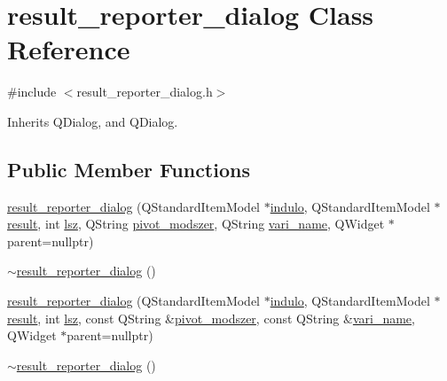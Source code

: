 \hypertarget{classresult__reporter__dialog}{}\section{result\+\_\+reporter\+\_\+dialog Class Reference}
\label{classresult__reporter__dialog}


{\ttfamily \#include $<$result\+\_\+reporter\+\_\+dialog.\+h$>$}



Inherits Q\+Dialog, and Q\+Dialog.

\subsection*{Public Member Functions}
\begin{DoxyCompactItemize}
\item 
\hyperlink{classresult__reporter__dialog_ad6b12890998c80ec5f69ee28ad28e533}{result\+\_\+reporter\+\_\+dialog} (Q\+Standard\+Item\+Model $\ast$\hyperlink{classresult__reporter__dialog_a0eb2cb5e19889d1cfac2a1d646881f4a}{indulo}, Q\+Standard\+Item\+Model $\ast$\hyperlink{classresult__reporter__dialog_abec7c912a4cada9f1468fa797891cf03}{result}, int \hyperlink{classresult__reporter__dialog_a913f9df7c2d4b76ac45c82d6540d8318}{lsz}, Q\+String \hyperlink{classresult__reporter__dialog_af5ebf610d22060e37051b13b6a830555}{pivot\+\_\+modszer}, Q\+String \hyperlink{classresult__reporter__dialog_a9e9486d712fcf04bba7dc075c884ef2d}{vari\+\_\+name}, Q\+Widget $\ast$parent=nullptr)
\item 
\hyperlink{classresult__reporter__dialog_a1d44819c105ea7c09e87d73247cf0efc}{$\sim$result\+\_\+reporter\+\_\+dialog} ()
\item 
\hyperlink{classresult__reporter__dialog_a2edb2abb1360433138892c9fc2236506}{result\+\_\+reporter\+\_\+dialog} (Q\+Standard\+Item\+Model $\ast$\hyperlink{classresult__reporter__dialog_a0eb2cb5e19889d1cfac2a1d646881f4a}{indulo}, Q\+Standard\+Item\+Model $\ast$\hyperlink{classresult__reporter__dialog_abec7c912a4cada9f1468fa797891cf03}{result}, int \hyperlink{classresult__reporter__dialog_a913f9df7c2d4b76ac45c82d6540d8318}{lsz}, const Q\+String \&\hyperlink{classresult__reporter__dialog_af5ebf610d22060e37051b13b6a830555}{pivot\+\_\+modszer}, const Q\+String \&\hyperlink{classresult__reporter__dialog_a9e9486d712fcf04bba7dc075c884ef2d}{vari\+\_\+name}, Q\+Widget $\ast$parent=nullptr)
\item 
\hyperlink{classresult__reporter__dialog_a1d44819c105ea7c09e87d73247cf0efc}{$\sim$result\+\_\+reporter\+\_\+dialog} ()
\end{DoxyCompactItemize}
